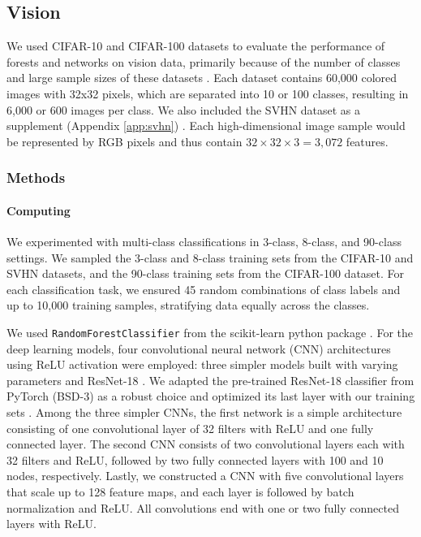 \subsection{Vision}
\label{vision}
We used CIFAR-10 and CIFAR-100 datasets to evaluate the performance of forests and networks on vision data, primarily because of the number of classes and large sample sizes of these datasets \citep{cifar}.
Each dataset contains 60,000 colored images with 32x32 pixels, which are separated into 10 or 100 classes, resulting in 6,000 or 600 images per class.
We also included the SVHN dataset as a supplement (Appendix \ref{app:svhn}) \citep{svhn}. 
Each high-dimensional image sample would be represented by RGB pixels and thus contain $32 \times 32 \times 3 = 3,072$ features.

\subsubsection{Methods}
\paragraph{Computing}
We experimented with multi-class classifications in 3-class, 8-class, and 90-class settings. We sampled the 3-class and 8-class training sets from the CIFAR-10 and SVHN datasets, and the 90-class training sets from the CIFAR-100 dataset. For each classification task, we ensured 45 random combinations of class labels and up to 10,000 training samples, stratifying data equally across the classes.

We used \texttt{RandomForestClassifier} from the scikit-learn python package \citep{scikit-learn}. For the deep learning models, four convolutional neural network (CNN) architectures using ReLU activation were employed: three simpler models built with varying parameters and ResNet-18 \citep{Priebe2020.04.29.068460, resnet}. We adapted the pre-trained ResNet-18 classifier from PyTorch (BSD-3) as a robust choice and optimized its last layer with our training sets \citep{pytorch}. Among the three simpler CNNs, the first network is a simple architecture consisting of one convolutional layer of 32 filters with ReLU and one fully connected layer. The second CNN consists of two convolutional layers each with 32 filters and ReLU, followed by two fully connected layers with 100 and 10 nodes, respectively. Lastly, we constructed a CNN with five convolutional layers that scale up to 128 feature maps, and each layer is followed by batch normalization and ReLU. All convolutions end with one or two fully connected layers with ReLU.

